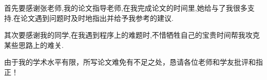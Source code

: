 首先要感谢张老师,我的论文指导老师,在我完成论文的时间里,她给与了我很多支持.在论文遇到问题时及时地指出并给予我参考的建议.

其次要感谢我的同学,在我遇到程序上的难题时,不惜牺牲自己的宝贵时间帮我攻克某些思路上的难关.

由于我的学术水平有限，所写论文难免有不足之处，恳请各位老师和学友批评和指正！

